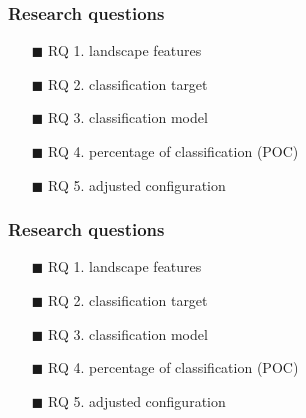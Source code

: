 \begin{frame}
	\frametitle{Research questions}
	
	\begin{itemize}\setlength{\itemsep}{10pt}
		\item[\textcolor{hni-gray}{$\blacksquare$}] \textcolor{hni-gray}{RQ 1. landscape features}
		\item[\textcolor{hni-gray}{$\blacksquare$}] \textcolor{hni-gray}{RQ 2. classification target}
		\item[$\blacksquare$] RQ 3. classification model
		\item[$\blacksquare$] RQ 4. percentage of classification (POC)
		\item[\textcolor{hni-gray}{$\blacksquare$}] \textcolor{hni-gray}{RQ 5. adjusted configuration}
	\end{itemize}
	
\end{frame}


\begin{frame}
	\frametitle{Research questions}
	
	\begin{itemize}\setlength{\itemsep}{10pt}
		\item[\textcolor{hni-gray}{$\blacksquare$}] \textcolor{hni-gray}{RQ 1. landscape features}
		\item[\textcolor{hni-gray}{$\blacksquare$}] \textcolor{hni-gray}{RQ 2. classification target}
		\item[\textcolor{hni-gray}{$\blacksquare$}] \textcolor{hni-gray}{RQ 3. classification model}
		\item[\textcolor{hni-gray}{$\blacksquare$}] \textcolor{hni-gray}{RQ 4. percentage of classification (POC)}
		\item[$\blacksquare$] RQ 5. adjusted configuration
	\end{itemize}
	
\end{frame}














